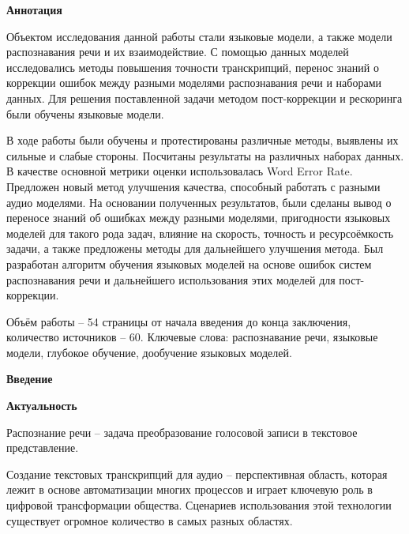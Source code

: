 \newpage
\begin{center}
  \textbf{\large Аннотация}
\end{center}


Объектом исследования данной работы стали языковые модели, а также модели распознавания речи и их взаимодействие.
С помощью данных моделей исследовались методы повышения точности транскрипций, перенос знаний о коррекции ошибок между разными моделями распознавания речи и наборами данных.
Для решения поставленной задачи методом пост-коррекции и рескоринга были обучены языковые модели.

В ходе работы были обучены и протестированы различные методы, выявлены их сильные и слабые стороны.
Посчитаны результаты на различных наборах данных.
В качестве основной метрики оценки использовалась Word Error Rate.
Предложен новый метод улучшения качества, способный работать с разными аудио моделями.
На основании полученных результатов, были сделаны вывод о переносе знаний об ошибках между разными моделями, пригодности языковых моделей для такого рода задач, влияние на скорость, точность и ресурсоёмкость задачи, а также предложены методы для дальнейшего улучшения метода.
Был разработан алгоритм обучения языковых моделей на основе ошибок систем распознавания речи и дальнейшего использования этих моделей для пост-коррекции.

Объём работы -- 54 страницы от начала введения до конца заключения, количество источников -- 60.
Ключевые слова: распознавание речи, языковые модели, глубокое обучение, дообучение языковых моделей.
\onehalfspacing

\newpage
\renewcommand{\contentsname}{\centerline{\large Содержание}}
\tableofcontents

\newpage
\begin{center}
  \textbf{\large Введение}
\end{center}


\textbf{Актуальность}

Распознание речи -- задача преобразование голосовой записи в текстовое представление.

Создание текстовых транскрипций для аудио  -- перспективная область, которая лежит в основе автоматизации многих процессов и играет ключевую роль в цифровой трансформации общества.
Сценариев использования этой технологии существует огромное количество в самых разных областях.

